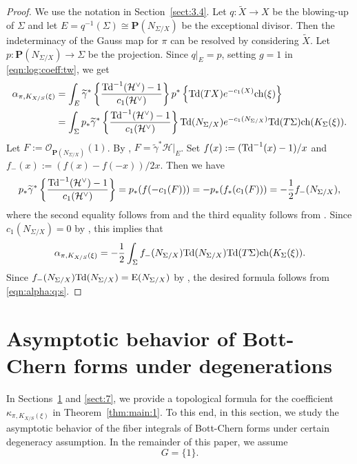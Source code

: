 \documentclass[amscd, leqno]{amsart}
\theoremstyle{plain}
\theoremstyle{definition}
\theoremstyle{remark}
\newenvironment{pf}{\begin{proof}}{\end{proof}}
\begin{document}
\begin{pf}
We use the notation in Section~\ref{sect:3.4}. Let $q \colon \widetilde{X} \to X$ be the blowing-up of $\Sigma$ and
let $E = q^{-1}(\Sigma) \cong {\mathbf P}(N_{\Sigma/X})$ be the exceptional divisor. Then the indeterminacy of the Gauss map for $\pi$ 
can be resolved by considering $\widetilde{X}$. 
Let $p \colon {\mathbf P}(N_{\Sigma/X}) \to \Sigma$ be the projection. Since $q|_{E}=p$, setting $g=1$ in \eqref{eqn:log:coeff:tw}, we get
$$
\begin{aligned}
\alpha_{\pi, K_{X/S}(\xi)} 
&= 
\int_{E} \widetilde{\gamma}^{*} 
\left\{ \frac{{\rm Td}^{-1}({\mathcal H}^{\lor})-1}{c_{1}({\mathcal H}^{\lor})} \right\} p^{*}\left\{ {\rm Td}(TX) e^{-c_{1}(X)} {\rm ch}(\xi) \right\}
\\
&=
\int_{\Sigma} p_{*} \widetilde{\gamma}^{*} \left\{ \frac{{\rm Td}^{-1}({\mathcal H}^{\lor})-1}{c_{1}({\mathcal H}^{\lor})} \right\} 
{\rm Td}(N_{\Sigma/X}) e^{-c_{1}(N_{\Sigma/X})} {\rm Td}(T\Sigma) {\rm ch}(K_{\Sigma}(\xi)).
\end{aligned}
$$ 
Let $F:= {\mathcal O}_{{\mathbf P}(N_{\Sigma/X})}(1)$. 
By \cite[(23)]{Yoshikawa07}, $F = \widetilde{\gamma}^{*}{\mathcal H}|_{E}$. Set $f(x) := ({\rm Td}^{-1}(x) - 1)/x$ and
$f_{-}(x) := ( f(x) - f(-x) )/2x$. Then we have
$$
p_{*} \widetilde{\gamma}^{*} \left\{ \frac{{\rm Td}^{-1}({\mathcal H}^{\lor})-1}{c_{1}({\mathcal H}^{\lor})} \right\} 
=
p_{*}( f( -c_{1}(F) ))
=
-p_{*}( f_{*}( c_{1}(F) ))
=
-\frac{1}{2} f_{-}(N_{\Sigma/X}),
$$
where the second equality follows from \cite[p.80 last line]{Yoshikawa07} and the third equality follows from \cite[p.81]{Yoshikawa07}.
Since $c_{1}(N_{\Sigma/X})=0$ by \cite[(2.9)]{Bismut97}, this implies that 
\begin{equation}
\label{eqn:alpha:q:s}
\alpha_{\pi, K_{X/S}(\xi)} 
= 
- \frac{1}{2} \int_{\Sigma} f_{-}(N_{\Sigma/X}) {\rm Td}(N_{\Sigma/X}) {\rm Td}(T\Sigma) {\rm ch}(K_{\Sigma}(\xi)).
\end{equation}
Since $f_{-}(N_{\Sigma/X}) {\rm Td}(N_{\Sigma/X}) = {\rm E}(N_{\Sigma/X})$ by \cite[(29)]{Yoshikawa07},
the desired formula follows from \eqref{eqn:alpha:q:s}.
\end{pf}






\section
{Asymptotic behavior of Bott-Chern forms under degenerations}
\label{sect:6}
\par
In Sections~\ref{sect:6} and \ref{sect:7}, we provide a topological formula for the coefficient $\kappa_{\pi,K_{X/S}(\xi)}$ 
in Theorem~\ref{thm:main:1}. To this end, in this section, 
we study the asymptotic behavior of the fiber integrals of Bott-Chern forms under certain degeneracy assumption. 
In the remainder of this paper, we assume 
$$
G = \{ 1 \}.
$$
\end{document}
